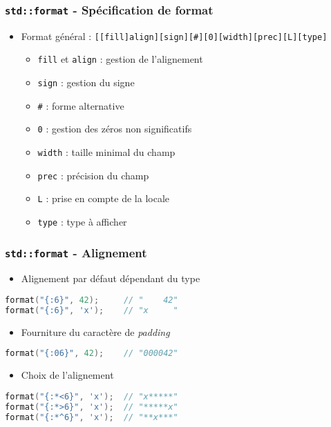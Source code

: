 \documentclass[C++.tex]{subfiles}
\begin{document}
\begin{frame}[fragile]
	\frametitle{\lstinline|std::format| - Spécification de format}
	\begin{itemize}
		\item Format général : \lstinline|[[fill]align][sign][#][0][width][prec][L][type]|
		\begin{itemize}
			\item \lstinline|fill| et \lstinline|align| : gestion de l'alignement
			\item \lstinline|sign| : gestion du signe
			\item \lstinline|#| : forme alternative
			\item \lstinline|0| : gestion des zéros non significatifs
			\item \lstinline|width| : taille minimal du champ
			\item \lstinline|prec| : précision du champ
			\item \lstinline|L| : prise en compte de la locale
			\item \lstinline|type| : type à afficher
		\end{itemize}
	\end{itemize}
\end{frame}

\begin{frame}[fragile]
	\frametitle{\lstinline|std::format| - Alignement}
	\begin{itemize}
		\item Alignement par défaut dépendant du type
	\end{itemize}

	\begin{lstlisting}[language=C++]
format("{:6}", 42);    	// "    42"
format("{:6}", 'x');   	// "x     "\end{lstlisting}

	\begin{itemize}
		\item Fourniture du caractère de \textit{padding}
	\end{itemize}

	\begin{lstlisting}[language=C++]
format("{:06}", 42);    // "000042"\end{lstlisting}

	\begin{itemize}
		\item Choix de l'alignement
	\end{itemize}

	\begin{lstlisting}[language=C++]
format("{:*<6}", 'x'); 	// "x*****"
format("{:*>6}", 'x'); 	// "*****x"
format("{:*^6}", 'x'); 	// "**x***"\end{lstlisting}
\end{frame}
\end{document}
